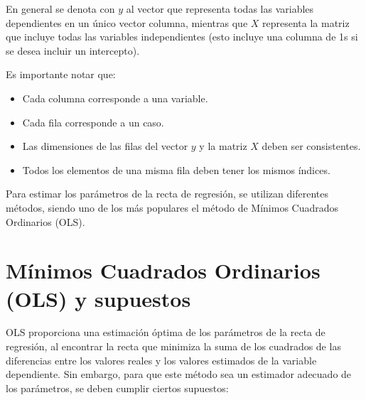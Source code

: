 \documentclass[
]{book}
\providecommand{\tightlist}{%
  \setlength{\itemsep}{0pt}\setlength{\parskip}{0pt}}
\begin{document}
En general se denota con \(y\) al vector que representa todas las
variables dependientes en un único vector columna, mientras que \(X\)
representa la matriz que incluye todas las variables independientes
(esto incluye una columna de 1s si se desea incluir un intercepto).

Es importante notar que:

\begin{itemize}
\tightlist
\item
  Cada columna corresponde a una variable.
\item
  Cada fila corresponde a un caso.
\item
  Las dimensiones de las filas del vector \(y\) y la matriz \(X\) deben
  ser consistentes.
\item
  Todos los elementos de una misma fila deben tener los mismos
  índices.
\end{itemize}

Para estimar los parámetros de la recta de regresión, se utilizan
diferentes métodos, siendo uno de los más populares el método de Mínimos
Cuadrados Ordinarios (OLS).

\section{Mínimos Cuadrados Ordinarios (OLS) y supuestos}\label{muxednimos-cuadrados-ordinarios-ols-y-supuestos-1}

OLS proporciona una estimación óptima de los parámetros de la recta de
regresión, al encontrar la recta que minimiza la suma de los cuadrados
de las diferencias entre los valores reales y los valores estimados de
la variable dependiente. Sin embargo, para que este método sea un
estimador adecuado de los parámetros, se deben cumplir ciertos
supuestos:
\end{document}
